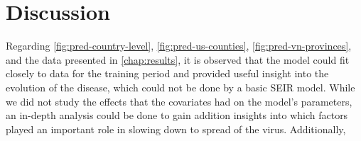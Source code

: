 \chapter{Discussion}
\label{chap:discussion}

Regarding \autoref{fig:pred-country-level}, \autoref{fig:pred-us-counties}, \autoref{fig:pred-vn-provinces}, and the data presented in \autoref{chap:results}, it is observed that the model could fit closely to data for the training period and provided useful insight into the evolution of the disease, which could not be done by a basic \gls{SEIR} model.
While we did not study the effects that the covariates had on the model's parameters, an in-depth analysis could be done to gain addition insights into which factors played an important role in slowing down to spread of the virus.
Additionally,